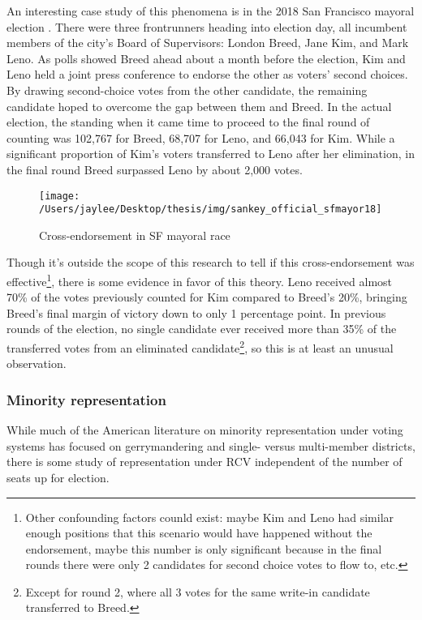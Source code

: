 \documentclass[12pt,twoside]{reedthesis}
\theoremstyle{definition}
\theoremstyle{definition}
\theoremstyle{definition}
\theoremstyle{remark}
\begin{document}
An interesting case study of this phenomena is in the 2018 San Francisco
mayoral election . There were three frontrunners heading into election
day, all incumbent members of the city's Board of Supervisors: London
Breed, Jane Kim, and Mark Leno. As polls showed Breed ahead about a
month before the election, Kim and Leno held a joint press conference to
endorse the other as voters' second choices. By drawing second-choice
votes from the other candidate, the remaining candidate hoped to
overcome the gap between them and Breed. In the actual election, the
standing when it came time to proceed to the final round of counting was
102,767 for Breed, 68,707 for Leno, and 66,043 for Kim. While a
significant proportion of Kim's voters transferred to Leno after her
elimination, in the final round Breed surpassed Leno by about 2,000
votes.
\begin{figure}
\texttt{[image: /Users/jaylee/Desktop/thesis/img/sankey\_official\_sfmayor18]} \caption{Cross-endorsement in SF mayoral race}\label{fig:unnamed-chunk-2}
\end{figure}
Though it's outside the scope of this research to tell if this
cross-endorsement was effective\footnote{Other confounding factors
  counld exist: maybe Kim and Leno had similar enough positions that
  this scenario would have happened without the endorsement, maybe this
  number is only significant because in the final rounds there were only
  2 candidates for second choice votes to flow to, etc.}, there is some
evidence in favor of this theory. Leno received almost 70\% of the votes
previously counted for Kim compared to Breed's 20\%, bringing Breed's
final margin of victory down to only 1 percentage point. In previous
rounds of the election, no single candidate ever received more than 35\%
of the transferred votes from an eliminated candidate\footnote{Except
  for round 2, where all 3 votes for the same write-in candidate
  transferred to Breed.}, so this is at least an unusual observation.

\hypertarget{minority-representation}{%
\subsubsection{Minority representation}\label{minority-representation}}

While much of the American literature on minority representation under
voting systems has focused on gerrymandering and single- versus
multi-member districts, there is some study of representation under RCV
independent of the number of seats up for election.
\end{document}
